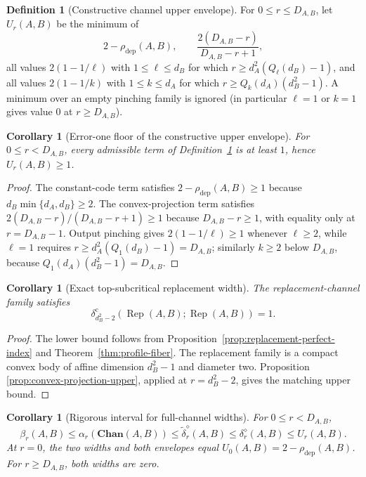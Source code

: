 \documentclass[11pt,a4paper]{article}
\theoremstyle{definition}
\newtheorem{definition}{Definition}[section]
\theoremstyle{plain}
\newtheorem{corollary}[theorem]{Corollary}
\theoremstyle{remark}
\newcommand{\Chan}{\mathbf{Chan}}
\newcommand{\rhodep}{\rho_{\mathrm{dep}}}
\begin{document}
\begin{definition}[Constructive channel upper envelope]
\label{def:channel-upper-envelope}
For $0\leq r\leq D_{A,B}$, let $U_r(A,B)$ be the minimum of
\[
2-\rhodep(A,B),
\qquad
\frac{2(D_{A,B}-r)}{D_{A,B}-r+1},
\]
all values $2(1-1/\ell)$ with $1\le\ell\le d_B$ for which
$r\geq d_A^2(Q_\ell(d_B)-1)$, and all values $2(1-1/k)$ with $1\le k\le d_A$ for which
$r\geq Q_k(d_A)(d_B^2-1)$. A minimum over an empty pinching family is
ignored (in particular $\ell=1$ or $k=1$ gives value $0$ at $r\ge D_{A,B}$).
\end{definition}

\begin{corollary}[Error-one floor of the constructive upper envelope]
\label{cor:upper-floor}
For $0\leq r<D_{A,B}$, every admissible term of
Definition~\ref{def:channel-upper-envelope} is at least $1$, hence
$U_r(A,B)\geq1$.
\end{corollary}

\begin{proof}
The constant-code term satisfies $2-\rhodep(A,B)\geq1$ because
$d_B\min\{d_A,d_B\}\ge2$. The convex-projection term satisfies
$2(D_{A,B}-r)/(D_{A,B}-r+1)\ge1$ because $D_{A,B}-r\ge1$, with equality
only at $r=D_{A,B}-1$. Output pinching gives $2(1-1/\ell)\ge1$ whenever
$\ell\ge2$, while $\ell=1$ requires
$r\ge d_A^2(Q_1(d_B)-1)=D_{A,B}$; similarly $k\ge2$ below $D_{A,B}$,
because $Q_1(d_A)(d_B^2-1)=D_{A,B}$.
\end{proof}

\begin{corollary}[Exact top-subcritical replacement width]
\label{cor:replacement-top-width}
The replacement-channel family satisfies
\[
\delta_{d_B^2-2}^{\mathrm c}
(\operatorname{Rep}(A,B);\operatorname{Rep}(A,B))=1.
\]
\end{corollary}

\begin{proof}
The lower bound follows from
Proposition~\ref{prop:replacement-perfect-index} and
Theorem~\ref{thm:profile-fiber}. The replacement family is a compact convex
body of affine dimension $d_B^2-1$ and diameter two. Proposition
\ref{prop:convex-projection-upper}, applied at $r=d_B^2-2$, gives the
matching upper bound.
\end{proof}

\begin{corollary}[Rigorous interval for full-channel widths]
\label{cor:full-width-interval}
For $0\leq r<D_{A,B}$,
\[
\beta_r(A,B)
\leq\alpha_r(\Chan(A,B))
\leq\widetilde\delta_r^\diamond(A,B)
\leq\delta_r^\diamond(A,B)
\leq U_r(A,B).
\]
At $r=0$, the two widths and both envelopes equal
$U_0(A,B)=2-\rhodep(A,B)$. For $r\geq D_{A,B}$, both widths are zero.
\end{corollary}
\end{document}
